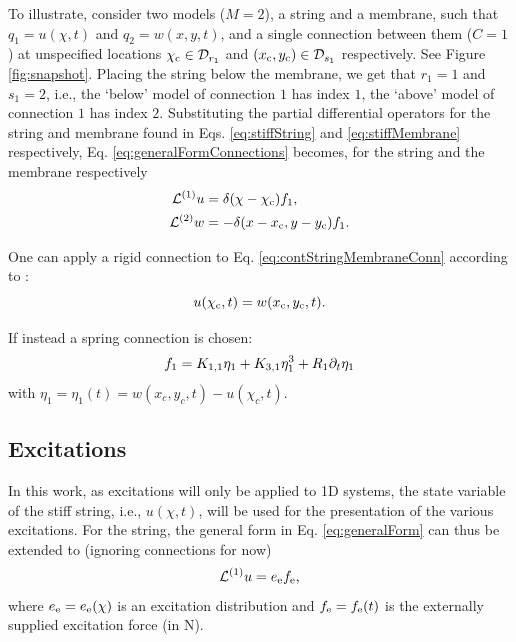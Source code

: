 \documentclass{article}
\begin{document}
  
To illustrate, consider two models ($M=2$), a string and a membrane, such that $q_1 = u(\chi ,t)$ and $q_2 = w(x,y,t)$, and a single connection between them ($C = 1$) at unspecified locations $\chi_{\text{c}} \in \mathcal{D}_{r_1}$ and $(x_{\text{c}}, y_{\text{c}}) \in \mathcal{D}_{s_1}$ respectively. See Figure \ref{fig:snapshot}. Placing the string below the membrane, we get that $r_1 = 1$ and $s_1 = 2$, i.e., the `below' model of connection $1$ has index $1$, the `above' model of connection $1$ has index $2$. Substituting the partial differential operators for the string and membrane found in Eqs. \eqref{eq:stiffString} and \eqref{eq:stiffMembrane} respectively, Eq. \eqref{eq:generalFormConnections} becomes, for the string and the membrane respectively
\begin{subequations}
\begin{align}\label{eq:contStringMembraneConn}
        \mathcal{L}^{(1)} u &= \delta(\chi - \chi_{\text{c}})f_1,\\
        \mathcal{L}^{(2)} w &= -\delta(x - x_{\text{c}}, y-y_{\text{c}})f_1.
\end{align}
\end{subequations}

One can apply a rigid connection to Eq. \eqref{eq:contStringMembraneConn} according to \cite{theBible}: 
\begin{equation}
    u(\chi_{\text{c}}, t) = w(x_{\text{c}}, y_{\text{c}}, t).
\end{equation} 

If instead a spring connection is chosen:
\begin{equation}
    f_1 = K_{1, 1}\eta_1 + K_{3, 1}\eta_1^3 + R_1\partial_t \eta_1
\end{equation}
with $\eta_1 = \eta_1(t) = w(x_c, y_c, t) - u(\chi_c, t)$.

\subsection{Excitations}\label{sec:contExcitations}
In this work, as excitations will only be applied to 1D systems, the state variable of the stiff string, i.e., $u(\chi, t)$, will be used for the presentation of the various excitations. For the string, the general form in Eq. \eqref{eq:generalForm}
can thus be extended to (ignoring connections for now)
\begin{equation}\label{eq:generalFormString}
    \mathcal{L}^{(1)} u = e_{\text{e}} f_{\text{e}},
\end{equation}
where $e_{\text{e}} = e_{\text{e}}(\chi)$ is an excitation distribution and $f_{\text{e}} = f_{\text{e}}(t)$ is the externally supplied excitation force (in N).
\end{document}
